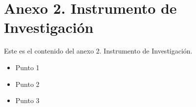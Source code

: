 
\chapter*{Anexo 2. Instrumento de Investigación} 

Este es el contenido del anexo 2. Instrumento de Investigación.

\begin{itemize}
    \item Punto 1
    \item Punto 2
    \item Punto 3
\end{itemize}